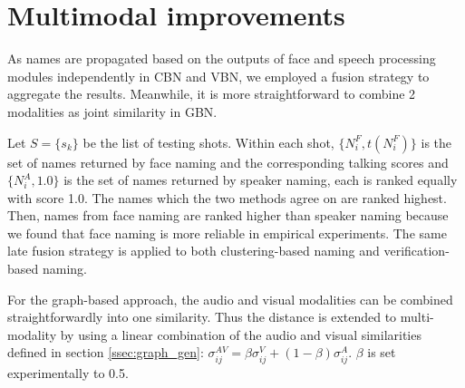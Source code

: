 \section{Multimodal improvements}
\label{sec:naming}

As names are propagated based on the outputs of face and speech processing modules independently in CBN and VBN, we employed a fusion strategy to aggregate the results. Meanwhile, it is more straightforward to combine 2 modalities as joint similarity in GBN.

 Let $S = \{s_k\}$ be the list of testing shots. Within each shot, $\{N^F_i, t(N^F_i)\}$ is the set of names returned by face naming and the corresponding talking scores and $\{N^A_i, 1.0\}$  is the set of names returned by speaker naming, each is ranked equally with score 1.0.
%
The names which the two methods agree on are ranked highest. 
%
Then, names from face naming are ranked higher than speaker naming  because we found that face naming is more reliable in empirical experiments.
%
%
The same late fusion strategy is applied to both clustering-based naming and verification-based naming.

 For the graph-based approach, the audio and visual modalities can be combined straightforwardly into one similarity.
%
Thus the distance is extended to multi-modality by using a linear combination of the audio and visual similarities defined in section \ref{ssec:graph_gen}: $\sigma^{AV}_{ij} = \beta \sigma^V_{ij} + (1-\beta) \sigma^A_{ij}$. $\beta$ is set experimentally to 0.5.

\endinput

\begin{algorithm}
  \caption{Ranking names within shots
    \label{algo:ranking}}
  \begin{algorithmic}[1]
	  \For{$s_k \in S$}
 	  	    \State{$Q_{s_k} = \emptyset$}
		    \State{Face\_naming$(s_k) \Rightarrow (N^F_i, t(N^F_i))$}
				\State{Speaker\_naming$(s_k) \Rightarrow (N^A_j, 1.0)$}
				\For{each $N^F_i$}
					\If{$\exists N^A_j / N^A_j = N^F_i$}
						\State{$Q_{s_k} = Q_{s_k} \cup \{(N^F_i, t(N^F_i) + 2.0)\}$}
					\Else
						\State{$Q_{s_k} = Q_{s_k} \cup \{(N^F_i, t(N^F_i) + 1.0)\}$}
					\EndIf
				\EndFor
				\For{each $N^A_j$}
					\If{not $\exists N^F_i / N^F_i = N^A_j$}
						\State{$Q_{s_k} = Q_{s_k} \cup \{(N^A_j, 1.0)\}$}
					\EndIf
				\EndFor
		\EndFor
  \end{algorithmic}
\end{algorithm}
%